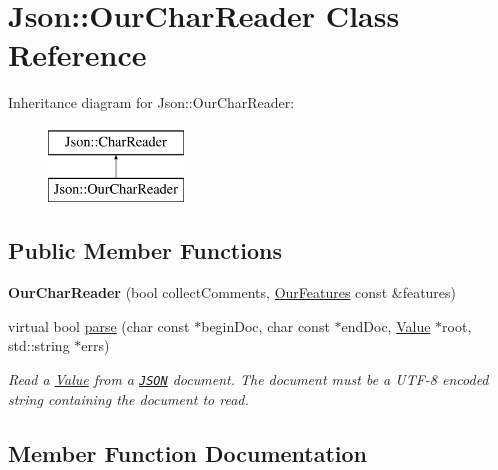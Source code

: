 \hypertarget{class_json_1_1_our_char_reader}{}\section{Json\+:\+:Our\+Char\+Reader Class Reference}
\label{class_json_1_1_our_char_reader}
Inheritance diagram for Json\+:\+:Our\+Char\+Reader\+:\begin{figure}[H]
\begin{center}
\leavevmode
\includegraphics[height=2.000000cm]{class_json_1_1_our_char_reader}
\end{center}
\end{figure}
\subsection*{Public Member Functions}
\begin{DoxyCompactItemize}
\item 
\hypertarget{class_json_1_1_our_char_reader_a5015506620e7ba7bab417756fa1ca9fe}{}{\bfseries Our\+Char\+Reader} (bool collect\+Comments, \hyperlink{class_json_1_1_our_features}{Our\+Features} const \&features)\label{class_json_1_1_our_char_reader_a5015506620e7ba7bab417756fa1ca9fe}

\item 
virtual bool \hyperlink{class_json_1_1_our_char_reader_aa4dce03aee1c111679813133c29f4465}{parse} (char const $\ast$begin\+Doc, char const $\ast$end\+Doc, \hyperlink{class_json_1_1_value}{Value} $\ast$root, std\+::string $\ast$errs)
\begin{DoxyCompactList}\small\item\em Read a \hyperlink{class_json_1_1_value}{Value} from a \href{http://www.json.org}{\tt J\+S\+O\+N} document. The document must be a U\+T\+F-\/8 encoded string containing the document to read. \end{DoxyCompactList}\end{DoxyCompactItemize}


\subsection{Member Function Documentation}
\hypertarget{class_json_1_1_our_char_reader_aa4dce03aee1c111679813133c29f4465}{}
